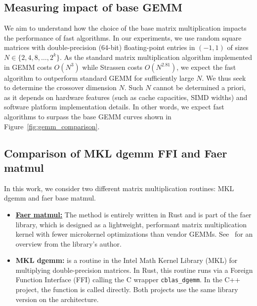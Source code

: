 \documentclass[a4paper, leqno, 11pt]{article}
\theoremstyle{definition}
\theoremstyle{remark}
\theoremstyle{experimental}
\begin{document}
\subsection{Measuring impact of base GEMM}

We aim to understand how the choice of the base matrix multiplication impacts the performance of fast
algorithms. In our experiments, we use random square matrices with double-precision (64-bit) floating-point entries 
in $(-1,1)$ of sizes $N \in \{2,4,8,\dots,2^k\}$. As the standard matrix multiplication algorithm
implemented in GEMM costs $O(N^3)$ while Strassen costs $O(N^{2.81})$, we expect the fast algorithm to outperform standard GEMM for sufficiently large $N$. We thus seek to determine the crossover dimension $N$. Such $N$ cannot be determined a priori, as it
depends on hardware features (such as cache capacities, SIMD widths) and software platform implementation details. In other words, we expect fast algorithms to surpass the base GEMM curves shown in Figure~\ref{fig:gemm_comparison}.

\subsection{Comparison of MKL dgemm FFI and Faer matmul}

In this work, we consider two different matrix multiplication routines: MKL dgemm and faer base matmul. 
\begin{itemize}
  \item \textbf{\href{https://docs.rs/faer-core/latest/faer_core/mul/fn.matmul.html}{Faer matmul:}}
    The method is entirely written in Rust and is part of the faer library, which is designed as a
    lightweight, performant matrix multiplication kernel with fewer microkernel optimizations than
    vendor GEMMs. See~\cite{ek2026nanogemm} for an overview from the library's author.
  \item \textbf{MKL dgemm:} is a routine in the Intel Math Kernel Library (MKL) for multiplying
    double-precision matrices. In Rust, this routine runs via a Foreign Function Interface (FFI)
    calling the C wrapper \texttt{cblas\_dgemm}. In the C++ project, the function is called
    directly. Both projects use the same library version on the architecture.
\end{itemize}
\end{document}
